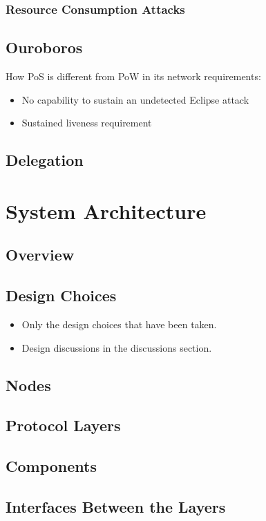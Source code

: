 \documentclass{report}
\theoremstyle{definition}{
  \newtheorem{lemma}{Lemma}[section] %
  \newtheorem{definition}[lemma]{Definition}
}
\theoremstyle{theorem}{
  \newtheorem{invariant}[lemma]{Invariant}
  \newtheorem{proofobligation}[lemma]{Proof Obligation}
}
\numberwithin{equation}{lemma}
\begin{document}
\subsection{Resource Consumption Attacks}


\section{Ouroboros}

How PoS is different from PoW in its network requirements:

\begin{itemize}
  \item No capability to sustain an undetected Eclipse attack
  \item Sustained liveness requirement
\end{itemize}

\section{Delegation}

\chapter{System Architecture}
\section{Overview}
\section{Design Choices}
\begin{itemize}
\item Only the design choices that have been taken.
\item Design discussions in the discussions section.
\end{itemize}
\section{Nodes}
\section{Protocol Layers}
\section{Components}\section{Interfaces Between the Layers}
\end{document}
